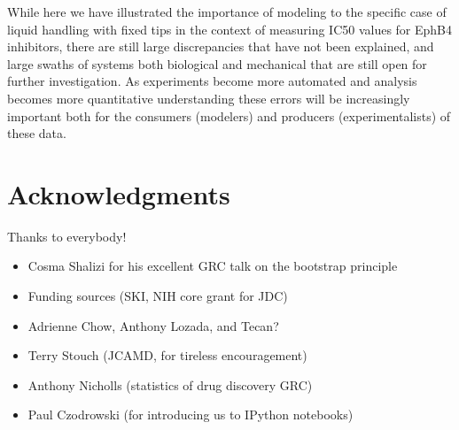 \documentclass[aps,pre,twocolumn,nofootinbib,superscriptaddress,linenumbers]{revtex4-1}
\begin{document}
While here we have illustrated the importance of modeling to the specific case of liquid handling with fixed tips in the context of measuring IC50 values for EphB4 inhibitors, there are still large discrepancies that have not been explained, and large swaths of systems both biological and mechanical that are still open for further investigation. 
As experiments become more automated and analysis becomes more quantitative understanding these errors will be increasingly important both for the consumers (modelers) and producers (experimentalists) of these data.


\section{Acknowledgments}
\label{section:acknowledgments}

Thanks to everybody!

\begin{itemize}
  \item Cosma Shalizi for his excellent GRC talk on the bootstrap principle
  \item Funding sources (SKI, NIH core grant for JDC)
  \item Adrienne Chow, Anthony Lozada, and Tecan?
  \item Terry Stouch (JCAMD, for tireless encouragement)
  \item Anthony Nicholls (statistics of drug discovery GRC)
  \item Paul Czodrowski (for introducing us to IPython notebooks)
\end{itemize}


 

\end{document}
